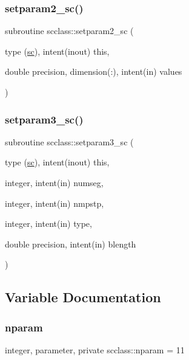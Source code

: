 \subsubsection{\texorpdfstring{setparam2\_sc()}{setparam2\_sc()}}
{\footnotesize\ttfamily subroutine scclass\+::setparam2\+\_\+sc (\begin{DoxyParamCaption}\item[{type (\mbox{\hyperlink{namespacescclass_structscclass_1_1sc}{sc}}), intent(inout)}]{this,  }\item[{double precision, dimension(\+:), intent(in)}]{values }\end{DoxyParamCaption})}

\mbox{\label{namespacescclass_a656d4cc4d5fe872ffa9df12bab721bec}} 
\subsubsection{\texorpdfstring{setparam3\_sc()}{setparam3\_sc()}}
{\footnotesize\ttfamily subroutine scclass\+::setparam3\+\_\+sc (\begin{DoxyParamCaption}\item[{type (\mbox{\hyperlink{namespacescclass_structscclass_1_1sc}{sc}}), intent(inout)}]{this,  }\item[{integer, intent(in)}]{numseg,  }\item[{integer, intent(in)}]{nmpstp,  }\item[{integer, intent(in)}]{type,  }\item[{double precision, intent(in)}]{blength }\end{DoxyParamCaption})}



\subsection{Variable Documentation}
\mbox{\label{namespacescclass_a78eec9a89964d83818db291873df4436}} 
\subsubsection{\texorpdfstring{nparam}{nparam}}
{\footnotesize\ttfamily integer, parameter, private scclass\+::nparam = 11\hspace{0.3cm}{\ttfamily [private]}}

